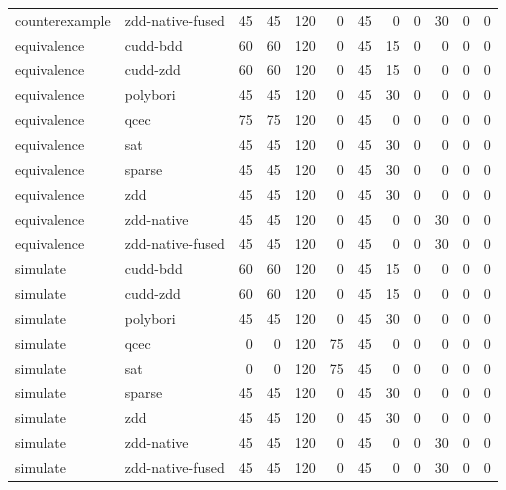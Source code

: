 \begin{table}[tbp]
\begin{tabular}{llrrrrrrrrrr}
counterexample & zdd-native-fused & 45 & 45 & 120 & 0 & 45 & 0 & 0 & 30 & 0 & 0 \\
equivalence & cudd-bdd & 60 & 60 & 120 & 0 & 45 & 15 & 0 & 0 & 0 & 0 \\
equivalence & cudd-zdd & 60 & 60 & 120 & 0 & 45 & 15 & 0 & 0 & 0 & 0 \\
equivalence & polybori & 45 & 45 & 120 & 0 & 45 & 30 & 0 & 0 & 0 & 0 \\
equivalence & qcec & 75 & 75 & 120 & 0 & 45 & 0 & 0 & 0 & 0 & 0 \\
equivalence & sat & 45 & 45 & 120 & 0 & 45 & 30 & 0 & 0 & 0 & 0 \\
equivalence & sparse & 45 & 45 & 120 & 0 & 45 & 30 & 0 & 0 & 0 & 0 \\
equivalence & zdd & 45 & 45 & 120 & 0 & 45 & 30 & 0 & 0 & 0 & 0 \\
equivalence & zdd-native & 45 & 45 & 120 & 0 & 45 & 0 & 0 & 30 & 0 & 0 \\
equivalence & zdd-native-fused & 45 & 45 & 120 & 0 & 45 & 0 & 0 & 30 & 0 & 0 \\
simulate & cudd-bdd & 60 & 60 & 120 & 0 & 45 & 15 & 0 & 0 & 0 & 0 \\
simulate & cudd-zdd & 60 & 60 & 120 & 0 & 45 & 15 & 0 & 0 & 0 & 0 \\
simulate & polybori & 45 & 45 & 120 & 0 & 45 & 30 & 0 & 0 & 0 & 0 \\
simulate & qcec & 0 & 0 & 120 & 75 & 45 & 0 & 0 & 0 & 0 & 0 \\
simulate & sat & 0 & 0 & 120 & 75 & 45 & 0 & 0 & 0 & 0 & 0 \\
simulate & sparse & 45 & 45 & 120 & 0 & 45 & 30 & 0 & 0 & 0 & 0 \\
simulate & zdd & 45 & 45 & 120 & 0 & 45 & 30 & 0 & 0 & 0 & 0 \\
simulate & zdd-native & 45 & 45 & 120 & 0 & 45 & 0 & 0 & 30 & 0 & 0 \\
simulate & zdd-native-fused & 45 & 45 & 120 & 0 & 45 & 0 & 0 & 30 & 0 & 0 \\
\bottomrule
\end{tabular}
\end{table}
